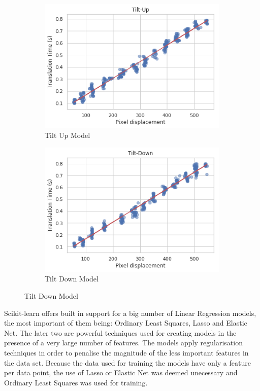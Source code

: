 \documentclass{l4proj}
\begin{document}
\begin{figure}[H]
\begin{subfigure}[b]{0.5\textwidth}
    \includegraphics[width=\textwidth]{l4template-master/images/tilt_up.png}
    \caption{Tilt Up Model}
    \label{tiltup}
  \end{subfigure}
  \begin{subfigure}[b]{0.5\textwidth}
    \includegraphics[width=\textwidth]{l4template-master/images/tilt_down.png}
    \caption{Tilt Down Model}
    \label{tiltdown}
  \end{subfigure}  
    
\end{figure}



Scikit-learn offers built in support for a big number of Linear Regression models, the most important of them being: Ordinary Least Squares, Lasso and Elastic Net. The later two are powerful techniques used for creating models in the presence of a very large number of features. The models apply regularisation techniques in order to penalise the magnitude of the less important features in the data set. Because the data used for training the models have only a feature per data point, the use of Lasso or Elastic Net was deemed unecessary and Ordinary Least Squares was used for training. 
\end{document}
